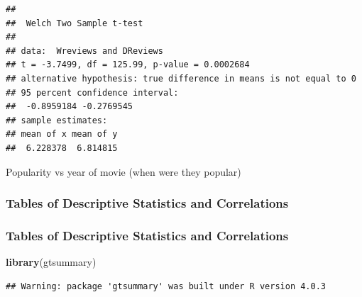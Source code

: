 \documentclass[]{article}
\newenvironment{Shaded}{\begin{snugshade}}{\end{snugshade}}
\newcommand{\KeywordTok}[1]{\textcolor[rgb]{0.13,0.29,0.53}{\textbf{#1}}}
\newcommand{\NormalTok}[1]{#1}
\newcommand{\OperatorTok}[1]{\textcolor[rgb]{0.81,0.36,0.00}{\textbf{#1}}}
\newcommand{\StringTok}[1]{\textcolor[rgb]{0.31,0.60,0.02}{#1}}
\begin{document}
\begin{verbatim}
## 
##  Welch Two Sample t-test
## 
## data:  Wreviews and DReviews
## t = -3.7499, df = 125.99, p-value = 0.0002684
## alternative hypothesis: true difference in means is not equal to 0
## 95 percent confidence interval:
##  -0.8959184 -0.2769545
## sample estimates:
## mean of x mean of y 
##  6.228378  6.814815
\end{verbatim}

Popularity vs year of movie (when were they popular)

\subsubsection{Tables of Descriptive Statistics and Correlations}
\label{sec:correlation-tables}


\subsubsection{Tables of Descriptive Statistics and Correlations}
\label{sec:correlation-tables}


\begin{Shaded}
\begin{Highlighting}[]
\KeywordTok{library}\NormalTok{(gtsummary)}
\end{Highlighting}
\end{Shaded}

\begin{verbatim}
## Warning: package 'gtsummary' was built under R version 4.0.3
\end{verbatim}

\begin{Shaded}
\end{Shaded}
\end{document}
